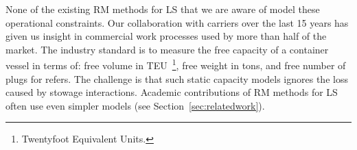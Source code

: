 None of the existing RM methods for LS that we are aware of model these operational constraints. Our collaboration with carriers over the last 15 years has given us insight in commercial work processes used by more than half of the market. The industry standard is to measure the free capacity of a container vessel in terms of: free volume in TEU~\footnote{Twentyfoot Equivalent Units.}, free weight in tons, and free number of plugs for refers. The challenge is that such static capacity models ignores the loss caused by stowage interactions. Academic contributions of RM methods for LS often use even simpler models (see Section~\ref{sec:relatedwork}).


